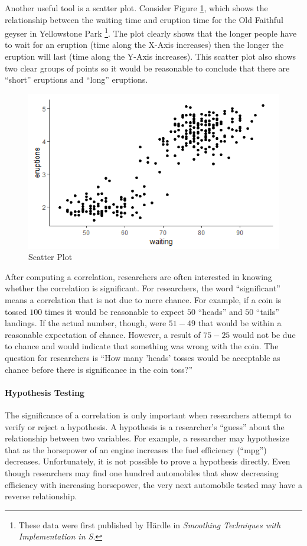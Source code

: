 Another useful tool is a scatter plot. Consider Figure \ref{14:fig05}, which shows the relationship between the waiting time and eruption time for the Old Faithful geyser in Yellowstone Park \footnote{These data were first published by H{\"a}rdle in \textit{Smoothing Techniques with Implementation in S}\cite{hardle2012smoothing}.}. The plot clearly shows that the longer people have to wait for an eruption (time along the X-Axis increases) then the longer the eruption will last (time along the Y-Axis increases). This scatter plot also shows two clear groups of points so it would be reasonable to conclude that there are ``short'' eruptions and ``long'' eruptions.

\begin{figure}[H]
	\centering
	\includegraphics[width=\maxwidth{.95\linewidth}]{gfx/14-Faithful}
	\caption{Scatter Plot}
	\label{14:fig05}
\end{figure}

After computing a correlation, researchers are often interested in knowing whether the correlation is significant. For researchers, the word ``significant'' means a correlation that is not due to mere chance. For example, if a coin is tossed $ 100 $ times it would be reasonable to expect $ 50 $ ``heads'' and $ 50 $ ``tails'' landings. If the actual number, though, were $ 51-49 $ that would be within a reasonable expectation of chance. However, a result of $ 75-25 $ would not be due to chance and would indicate that something was wrong with the coin. The question for researchers is ``How many 'heads' tosses would be acceptable as chance before there is significance in the coin toss?'' 

\paragraph{Hypothesis Testing}
The significance of a correlation is only important when researchers attempt to verify or reject a hypothesis. A hypothesis is a researcher's ``guess'' about the relationship between two variables. For example, a researcher may hypothesize that as the horsepower of an engine increases the fuel efficiency (``mpg'') decreases. Unfortunately, it is not possible to prove a hypothesis directly. Even though researchers may find one hundred automobiles that show decreasing efficiency with increasing horsepower, the very next automobile tested may have a reverse relationship.




